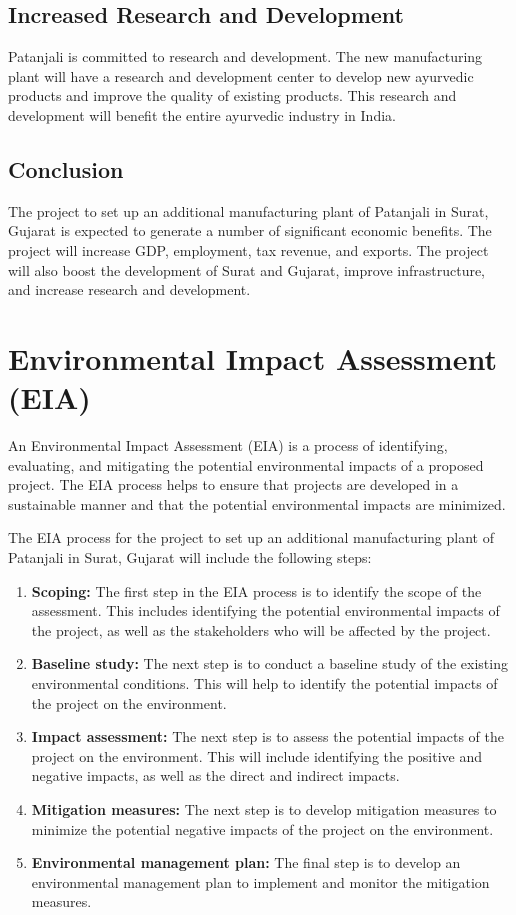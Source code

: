 \subsection{Increased Research and Development}
Patanjali is committed to research and development. The new manufacturing plant will have a research and development center to develop new ayurvedic products and improve the quality of existing products. This research and development will benefit the entire ayurvedic industry in India.

\subsection{Conclusion}
The project to set up an additional manufacturing plant of Patanjali in Surat, Gujarat is expected to generate a number of significant economic benefits. The project will increase GDP, employment, tax revenue, and exports. The project will also boost the development of Surat and Gujarat, improve infrastructure, and increase research and development.

\section{Environmental Impact Assessment (EIA)}
An Environmental Impact Assessment (EIA) is a process of identifying, evaluating, and mitigating the potential environmental impacts of a proposed project. The EIA process helps to ensure that projects are developed in a sustainable manner and that the potential environmental impacts are minimized.

The EIA process for the project to set up an additional manufacturing plant of Patanjali in Surat, Gujarat will include the following steps:

\begin{enumerate}
\item \textbf{Scoping:} The first step in the EIA process is to identify the scope of the assessment. This includes identifying the potential environmental impacts of the project, as well as the stakeholders who will be affected by the project.
\item \textbf{Baseline study:} The next step is to conduct a baseline study of the existing environmental conditions. This will help to identify the potential impacts of the project on the environment.
\item \textbf{Impact assessment:} The next step is to assess the potential impacts of the project on the environment. This will include identifying the positive and negative impacts, as well as the direct and indirect impacts.
\item \textbf{Mitigation measures:} The next step is to develop mitigation measures to minimize the potential negative impacts of the project on the environment.
\item \textbf{Environmental management plan:} The final step is to develop an environmental management plan to implement and monitor the mitigation measures.
\end{enumerate}

